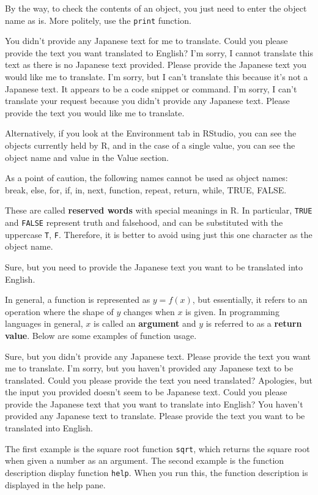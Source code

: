\documentclass[
  a4paper,
]{book}
\begin{document}
By the way, to check the contents of an object, you just need to enter
the object name as is. More politely, use the \texttt{print} function.

You didn't provide any Japanese text for me to translate. Could you
please provide the text you want translated to English? I'm sorry, I
cannot translate this text as there is no Japanese text provided. Please
provide the Japanese text you would like me to translate. I'm sorry, but
I can't translate this because it's not a Japanese text. It appears to
be a code snippet or command. I'm sorry, I can't translate your request
because you didn't provide any Japanese text. Please provide the text
you would like me to translate.

Alternatively, if you look at the Environment tab in RStudio, you can
see the objects currently held by R, and in the case of a single value,
you can see the object name and value in the Value section.

As a point of caution, the following names cannot be used as object
names: break, else, for, if, in, next, function, repeat, return, while,
TRUE, FALSE.

These are called \textbf{reserved words} with special meanings in R. In
particular, \texttt{TRUE} and \texttt{FALSE} represent truth and
falsehood, and can be substituted with the uppercase \texttt{T},
\texttt{F}. Therefore, it is better to avoid using just this one
character as the object name.

Sure, but you need to provide the Japanese text you want to be
translated into English.

In general, a function is represented as \(y=f(x)\), but essentially, it
refers to an operation where the shape of \(y\) changes when \(x\) is
given. In programming languages in general, \(x\) is called an
\textbf{argument} and \(y\) is referred to as a \textbf{return value}.
Below are some examples of function usage.

Sure, but you didn't provide any Japanese text. Please provide the text
you want me to translate. I'm sorry, but you haven't provided any
Japanese text to be translated. Could you please provide the text you
need translated? Apologies, but the input you provided doesn't seem to
be Japanese text. Could you please provide the Japanese text that you
want to translate into English? You haven't provided any Japanese text
to translate. Please provide the text you want to be translated into
English.

The first example is the square root function \texttt{sqrt}, which
returns the square root when given a number as an argument. The second
example is the function description display function \texttt{help}. When
you run this, the function description is displayed in the help pane.
\end{document}
